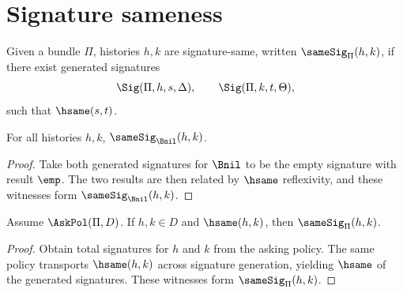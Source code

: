 \section{Signature sameness}

\begin{definition}
\label{def:signature-sameness-witnesses}
\label{def:signature-sameness}
Given a bundle \(\Pi\), histories \(h,k\) are signature-same, written \(\sameSig_\Pi(h,k)\), if there exist generated signatures
$$
\Sig(\Pi,h,s,\Delta),
\qquad
\Sig(\Pi,k,t,\Theta),
$$
such that \(\hsame(s,t)\).
\end{definition}

\begin{theorem}
\label{thm:samesig-empty-bundle}
For all histories $h,k$, $\sameSig_{\Bnil}(h,k)$.
\end{theorem}
\begin{proof}
Take both generated signatures for $\Bnil$ to be the empty signature with
result $\emp$. The two results are then related by $\hsame$ reflexivity, and
these witnesses form $\sameSig_{\Bnil}(h,k)$.
\end{proof}

\begin{theorem}
\label{thm:samesig-of-hsame-under-policy}
Assume $\AskPol(\Pi,D)$. If $h,k\in D$ and $\hsame(h,k)$, then $\sameSig_\Pi(h,k)$.
\end{theorem}
\begin{proof}
Obtain total signatures for $h$ and $k$ from the asking policy. The same policy transports $\hsame(h,k)$ across signature generation, yielding $\hsame$ of the generated signatures. These witnesses form $\sameSig_\Pi(h,k)$.
\end{proof}


